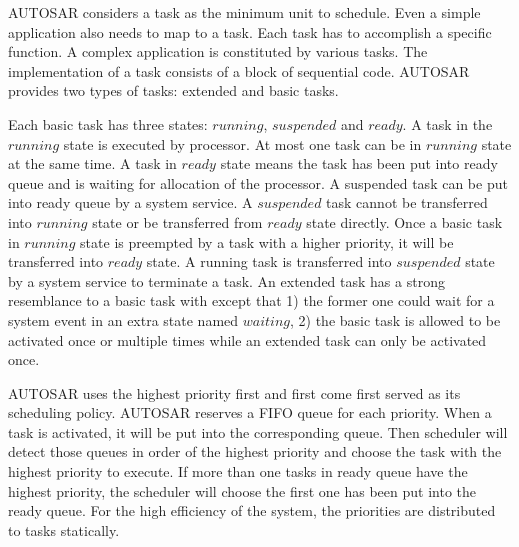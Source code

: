 \documentclass[sigconf]{acmart}
\begin{document}
AUTOSAR considers a task as the minimum unit to schedule. Even a simple application also needs to map to a task. Each task has to accomplish a specific function. A complex application is constituted by various tasks. The implementation of a task consists of a block of sequential code. AUTOSAR provides two types of tasks: extended and basic tasks.

Each basic task has three states: $running$, $suspended$ and $ready$. A task in the $running$ state is executed by processor. %
At most one task can be in $running$ state at the same time. A task in $ready$ state means the task has been put into ready queue and is waiting for allocation of the processor. A suspended task can be put into ready queue by a system service. A $suspended$ task cannot be transferred into $running$ state or be transferred from $ready$ state directly. Once a basic task in $running$ state is preempted by a task with a higher priority, it will be transferred into $ready$ state. A running task is transferred into $suspended$ state by a system service to terminate a task. An extended task has a strong resemblance to a basic task with except that 1) the former one could wait for a system event in an extra state named $waiting$, 2) the basic task is allowed to be activated once or multiple times while an extended task can only be activated once. 

AUTOSAR uses the highest priority first and first come first served as its scheduling policy. AUTOSAR reserves a FIFO queue for each priority. When a task is activated, it will be put into the corresponding queue. Then scheduler will detect those queues in order of the highest priority and choose the task with the highest priority to execute. If more than one tasks in ready queue have the highest priority, the scheduler will choose the first one has been put into the ready queue. For the high efficiency of the system, the priorities are distributed to tasks statically.
\end{document}
